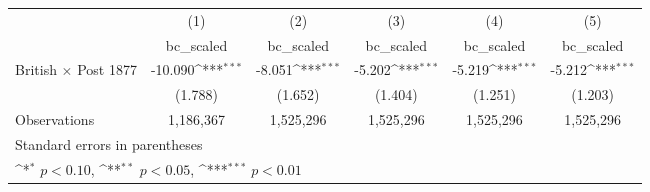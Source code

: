 {
\def\sym#1{\ifmmode^{#1}\else\(^{#1}\)\fi}
\begin{tabular}{l*{5}{c}}
\hline\hline
                    &\multicolumn{1}{c}{(1)}&\multicolumn{1}{c}{(2)}&\multicolumn{1}{c}{(3)}&\multicolumn{1}{c}{(4)}&\multicolumn{1}{c}{(5)}\\
                    &\multicolumn{1}{c}{bc\_scaled}&\multicolumn{1}{c}{bc\_scaled}&\multicolumn{1}{c}{bc\_scaled}&\multicolumn{1}{c}{bc\_scaled}&\multicolumn{1}{c}{bc\_scaled}\\
\hline
British $\times$ Post 1877&     -10.090\sym{***}&      -8.051\sym{***}&      -5.202\sym{***}&      -5.219\sym{***}&      -5.212\sym{***}\\
                    &     (1.788)         &     (1.652)         &     (1.404)         &     (1.251)         &     (1.203)         \\
\hline
Observations        &   1,186,367         &   1,525,296         &   1,525,296         &   1,525,296         &   1,525,296         \\
\hline\hline
\multicolumn{6}{l}{\footnotesize Standard errors in parentheses}\\
\multicolumn{6}{l}{\footnotesize \sym{*} \(p<0.10\), \sym{**} \(p<0.05\), \sym{***} \(p<0.01\)}\\
\end{tabular}
}
